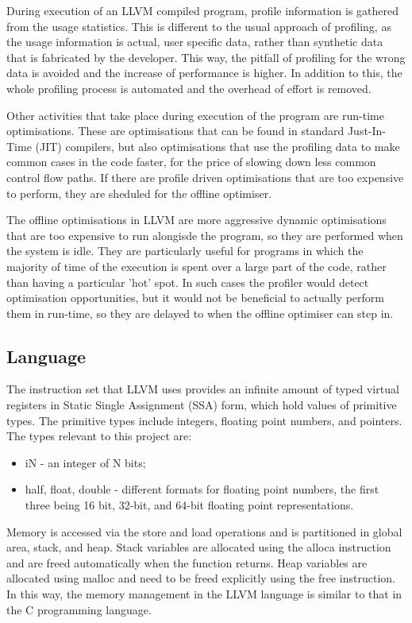 \documentclass[parskip]{cs4rep}
\begin{document}
During execution of an LLVM compiled program, profile information is gathered from the usage statistics. This is different to the usual approach of profiling, as the usage information is actual, user specific data, rather than synthetic data that is fabricated by the developer. This way, the pitfall of profiling for the wrong data is avoided and the increase of performance is higher. In addition to this, the whole profiling process is automated and the overhead of effort is removed. 

Other activities that take place during execution of the program are run-time optimisations. These are optimisations that can be found in standard Just-In-Time (JIT) compilers, but also optimisations that use the profiling data to make common cases in the code faster, for the price of slowing down less common control flow paths. If there are profile driven optimisations that are too expensive to perform, they are sheduled for the offline optimiser.

The offline optimisations in LLVM are more aggressive dynamic optimisations that are too expensive to run alongisde the program, so they are performed when the system is idle. They are particularly useful for programs in which the majority of time of the execution is spent over a large part of the code, rather than having a particular 'hot' spot. In such cases the profiler would detect optimisation opportunities, but it would not be beneficial to actually perform them in run-time, so they are delayed to when the offline optimiser can step in.

\subsection{Language} \label{sec:LLVMLanguage}

The instruction set that LLVM uses provides an infinite amount of typed virtual registers in Static Single Assignment (SSA) form, which hold values of primitive types. The primitive types include integers, floating point numbers, and pointers. The types relevant to this project are:
\begin{itemize}
\item iN - an integer of N bits;
\item half, float, double - different formats for floating point numbers, the first three being 16 bit, 32-bit, and 64-bit floating point representations.
\end{itemize}

Memory is accessed via the store and load operations and is partitioned in global area, stack, and heap. Stack variables are allocated using the alloca instruction and are freed automatically when the function returns. Heap variables are allocated using malloc and need to be freed explicitly using the free instruction. In this way, the memory management in the LLVM language is similar to that in the C programming language.
\end{document}
